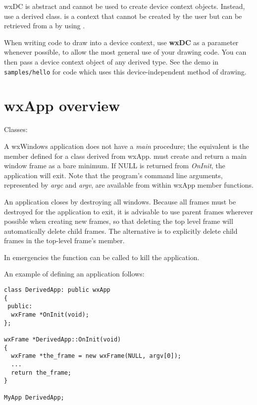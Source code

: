 wxDC is abstract and cannot be used to create
device context objects. Instead, use a derived class. \rtfsp
is a context that cannot be created by the user but can be retrieved from
a  by using .

When writing code to draw into a device context, use {\bf wxDC} as a
parameter whenever possible, to allow the most general use of your
drawing code.  You can then pass a device context object of any
derived type. See the demo in {\tt samples/hello} for code which
uses this device-independent method of drawing.

\section{wxApp overview}\label{wxappoverview}

Classes: 

A wxWindows
application does not have a {\it main} procedure; the equivalent is the
\rtfsp{} member defined for a class derived from wxApp.\rtfsp
{} must create and return a main window frame as a bare minimum.
If NULL is returned from {\it OnInit}, the application will exit.
Note that the program's command line arguments, represented by {\it
argc} and {\it argv}, are available from within wxApp member functions.

An application closes by destroying all windows. Because all frames must
be destroyed for the application to exit, it is advisable to use parent
frames wherever possible when creating new frames, so that deleting the
top level frame will automatically delete child frames. The alternative
is to explicitly delete child frames in the top-level frame's \rtfsp
member.

In emergencies the  function can be called to kill the
application.

An example of defining an application follows:

\begin{verbatim}
class DerivedApp: public wxApp
{
 public:
  wxFrame *OnInit(void);
};

wxFrame *DerivedApp::OnInit(void)
{
  wxFrame *the_frame = new wxFrame(NULL, argv[0]);
  ...
  return the_frame;
}

MyApp DerivedApp;
\end{verbatim}

